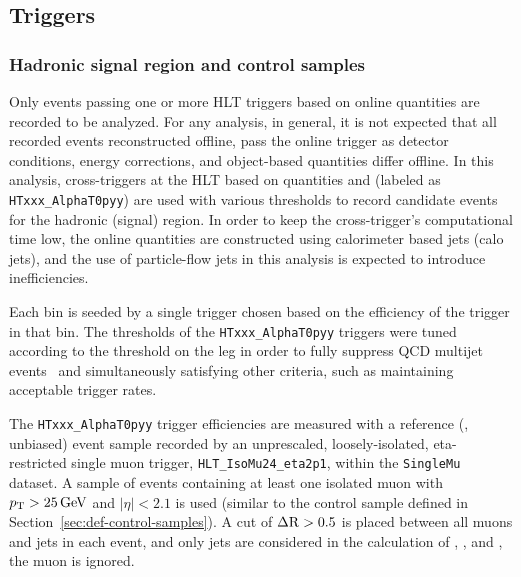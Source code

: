 \subsection{Triggers}

\subsubsection{Hadronic signal region and control samples\label{sec:signal_triggers}} 

Only events passing one or more HLT triggers based on online quantities 
are recorded to be analyzed. For any analysis, in general, it is 
not expected that all recorded events reconstructed offline, pass the online
trigger as detector conditions, energy corrections, and object-based quantities
differ offline. In this analysis, cross-triggers at the HLT
based on quantities \scalht and \alphat (labeled as \verb!HTxxx_AlphaT0pyy!) 
are used with various thresholds to record candidate events for the hadronic (signal)
region. In order to keep the cross-trigger's computational time low, the online quantities
are constructed using calorimeter based jets (calo jets), and the use of
particle-flow jets in this analysis is expected to introduce inefficiencies.

Each \scalht bin is seeded by a single trigger chosen based on the
efficiency of the trigger in that \scalht bin. The \alphat thresholds of the
\verb!HTxxx_AlphaT0pyy! triggers were tuned according to the threshold
on the \scalht leg in order to fully suppress QCD multijet events~\cite{RA1Paper2012}
and simultaneously satisfying other criteria, such as maintaining
acceptable trigger rates.



%
The \verb!HTxxx_AlphaT0pyy! trigger efficiencies are measured with a
reference (\ie, unbiased) event sample recorded by an unprescaled,
loosely-isolated, eta-restricted single muon 
trigger, \verb!HLT_IsoMu24_eta2p1!, within the \verb!SingleMu! dataset. A
sample of events containing at least one isolated muon with $p_{\mathrm{T}} >
25\,\text{Ge\hspace{-.08em}V}$ and $|\eta| < 2.1$ is used (similar to the \mj control sample
defined in Section~\ref{sec:def-control-samples}). A cut of $\Delta
{\rm R} > 0.5$ is placed between all muons and jets in each event, and
only jets are considered in the calculation of \scalht, \mht, and
\alphat, \ie the muon is ignored.

